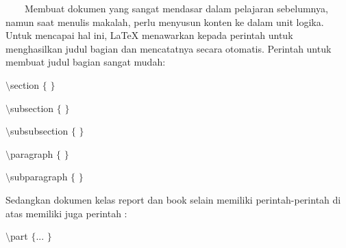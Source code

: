 \sloppy
\vspace{10pt}
~~~~Membuat dokumen yang sangat mendasar dalam pelajaran sebelumnya, namun saat menulis makalah, perlu menyusun konten ke dalam unit logika. Untuk mencapai hal ini, LaTeX menawarkan kepada perintah untuk menghasilkan judul bagian dan mencatatnya secara otomatis. Perintah untuk membuat judul bagian sangat mudah: \par
{\fontsize{10pt}{10pt}\selectfont  $  \setminus  $section $  \{  $ $  \}  $}
 \par
{\fontsize{10pt}{10pt}\selectfont  $  \setminus  $subsection $  \{  $ $  \}  $}
 \par
{\fontsize{10pt}{10pt}\selectfont  $  \setminus  $subsubsection $  \{  $ $  \}  $}
 \par
{\fontsize{10pt}{10pt}\selectfont  $  \setminus  $paragraph $  \{  $ $  \}  $}
 \par
{\fontsize{10pt}{10pt}\selectfont  $  \setminus  $subparagraph $  \{  $ $  \}  $}
 \par
\vspace{10pt}
\vspace{10pt}
Sedangkan dokumen kelas report dan book selain memiliki perintah-perintah di atas memiliki juga perintah :
 \par
{\fontsize{10pt}{10pt}\selectfont  $  \setminus  $part $  \{  $... $  \}  $}
 \par
\vspace{9pt}

